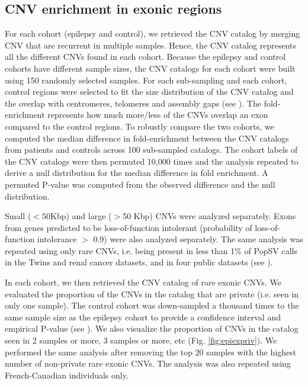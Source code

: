 \subsection*{CNV enrichment in exonic regions}
For each cohort (epilepsy and control), we retrieved the CNV catalog by merging CNV that are recurrent in multiple samples.
Hence, the CNV catalog represents all the different CNVs found in each cohort.
Because the epilepsy and control cohorts have different sample sizes, the CNV catalogs for each cohort were built using 150 randomly selected samples.
For each sub-sampling and each cohort, control regions were selected to fit the size distribution of the CNV catalog and the overlap with centromeres, telomeres and assembly gaps (see ).
The fold-enrichment represents how much more/less of the CNVs overlap an exon compared to the control regions.
To robustly compare the two cohorts, we computed the median difference in fold-enrichment between the CNV catalogs from patients and controls across 100 sub-sampled catalogs.
The cohort labels of the CNV catalogs were then permuted 10,000 times and the analysis repeated to derive a null distribution for the median difference in fold enrichment.
A permuted P-value was computed from the observed difference and the null distribution.

Small ($<$50Kbp) and large ($>$50 Kbp) CNVs were analyzed separately.
Exons from genes predicted to be loss-of-function intolerant\cite{Lek2016} (probability of loss-of-function intolerance $>$ 0.9) were also analyzed separately.
The same analysis was repeated using only rare CNVs, i.e. being present in less than 1\% of {\sf PopSV} calls in the Twins and renal cancer datasets, and in four public datasets (see ).

In each cohort, we then retrieved the CNV catalog of rare exonic CNVs.
We evaluated the proportion of the CNVs in the catalog that are private (i.e. seen in only one sample).
The control cohort was down-sampled a thousand times to the same sample size as the epilepsy cohort to provide a confidence interval and empirical P-value (see ).
We also visualize the proportion of CNVs in the catalog seen in 2 samples or more, 3 samples or more, etc (Fig. \ref{fig:epiexpriv}).
We performed the same analysis after removing the top 20 samples with the highest number of non-private rare exonic CNVs.
The analysis was also repeated using French-Canadian individuals only.

